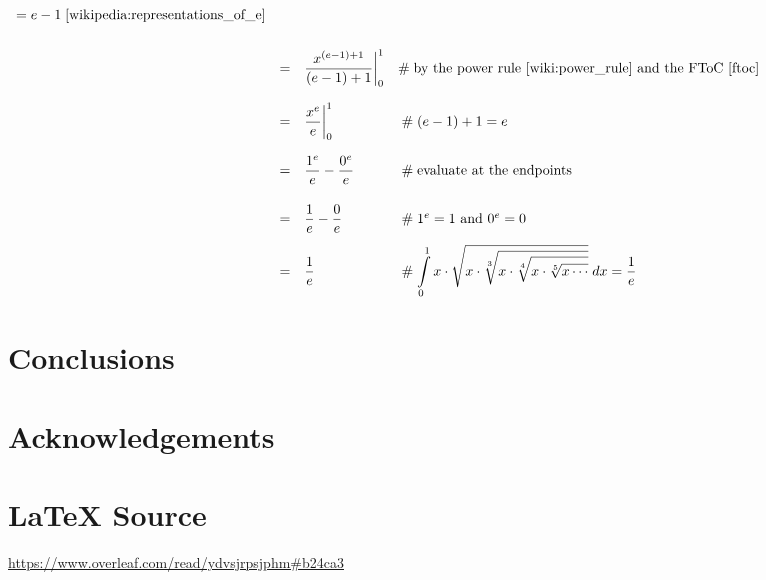 \documentclass{article}
\theoremstyle{definition}
\begin{document}
\begin{center}
\begin{math}
\begin{array}{llll}
											= e - 1 \; \cite{wikipedia:representations_of_e} \\
[18pt]
		&=& \dfrac{x^{(e-1)+1}}{(e-1)+1} \bigg |_{0}^{1} 
			&\hspace{0em} \mathrel{\#} \text{by the power rule \cite{wiki:power_rule}
												and the FToC \cite{ftoc}} \\
[18pt]
		&=& \dfrac{x^{e}}{e} \bigg |_{0}^{1}
			&\hspace{0.25em} \mathrel{\#} (e - 1) + 1 = e \\
[18pt]
		&=& \dfrac{1^{e}}{e} - \dfrac{0^{e}}{e}
			&\hspace{0.25em} \mathrel{\#} \text{evaluate at the endpoints} \\
[18pt]
		&=& \dfrac{1}{e} - \dfrac{0}{e}
			&\hspace{0.25em} \mathrel{\#} 1^e = 1 \text{ and } 0^e = 0 \\
[12pt]
		&=& \dfrac{1}{e}
			&\hspace{0.25em} \mathrel{\#} {\displaystyle \int\limits_{0}^{1} x \cdot 
	   		\sqrt{x \cdot \sqrt[3]{x \cdot \sqrt[4]{x \cdot \sqrt[5]{x \cdots}}}}} 
			\; dx = \dfrac{1}{e} 

	   \end{array}
	  \end{math}
\end{center}


\section{Conclusions}
\label{sec:conclusions}
%
%
%
\section*{Acknowledgements}
\label{sec:acknowledgements}
%
%
\section*{\LaTeX \hspace{0.025 mm} Source}
\url{https://www.overleaf.com/read/ydvsjrpsjphm#b24ca3}
%
%
%


%
%
%
%
%
\end{document}

